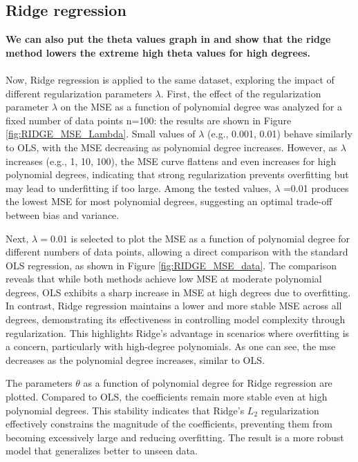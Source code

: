\documentclass[
 reprint,            %
 amsmath,amssymb,
 aps,
]{revtex4-2}
\begin{document}


\subsection{Ridge regression}
\textbf{We can also put the theta values graph in and show that the ridge method lowers the extreme high theta values for high degrees.}\\\\
Now, Ridge regression is applied to the same dataset, exploring the impact of different regularization parameters $\lambda$. First, the effect of the regularization parameter $\lambda $ on the MSE as a function of polynomial degree was analyzed for a fixed number of data points n=100: the results are shown in Figure \ref{fig:RIDGE_MSE_Lambda}.
Small values of $\lambda$ (e.g., 0.001, 0.01) behave similarly to OLS, with the MSE decreasing as polynomial degree increases. However, as $\lambda$ increases (e.g., 1, 10, 100), the MSE curve flattens and even increases for high polynomial degrees, indicating that strong regularization prevents overfitting but may lead to underfitting if too large.
Among the tested values, $\lambda$ =0.01 produces the lowest MSE for most polynomial degrees, suggesting an optimal trade-off between bias and variance.



Next, $\lambda = 0.01$ is selected to plot the MSE as a function of polynomial degree for different numbers of data points, allowing a direct comparison with the standard OLS regression, as shown in Figure \ref{fig:RIDGE_MSE_data}. 
The comparison reveals that while both methods achieve low MSE at moderate polynomial degrees, OLS exhibits a sharp increase in MSE at high degrees due to overfitting. In contrast, Ridge regression maintains a lower and more stable MSE across all degrees, demonstrating its effectiveness in controlling model complexity through regularization. This highlights Ridge's advantage in scenarios where overfitting is a concern, particularly with high-degree polynomials.
As one can see, the mse decreases as the polynomial degree increases, similar to OLS.


The parameters $\theta$ as a function of polynomial degree for Ridge regression are plotted. Compared to OLS, the coefficients remain more stable even at high polynomial degrees. 
This stability indicates that Ridge's $L_2$ regularization effectively constrains the magnitude of the coefficients, preventing them from becoming excessively large and reducing overfitting.
The result is a more robust model that generalizes better to unseen data.
\end{document}
